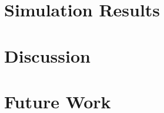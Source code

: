 \documentclass[a4paper,10pt]{IEEEtran}
\begin{document}
	\section{Simulation Results}
	
	\section{Discussion}
	\section{Future Work}
	
	
	\begin{thebibliography}{1}
		
	\end{thebibliography}
\end{document}
